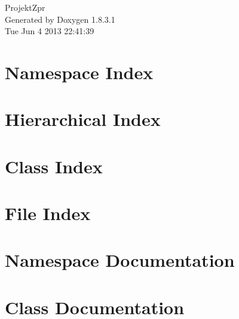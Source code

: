\documentclass{book}
\begin{document}
\begin{titlepage}
\vspace*{7cm}
\begin{center}
{\Large Projekt\-Zpr }\\
\vspace*{1cm}
{\large Generated by Doxygen 1.8.3.1}\\
\vspace*{0.5cm}
{\small Tue Jun 4 2013 22:41:39}\\
\end{center}
\end{titlepage}
\clearemptydoublepage
{}
\tableofcontents
\clearemptydoublepage
{}
\chapter{Namespace Index}

\chapter{Hierarchical Index}

\chapter{Class Index}

\chapter{File Index}

\chapter{Namespace Documentation}

\chapter{Class Documentation}































\end{document}
